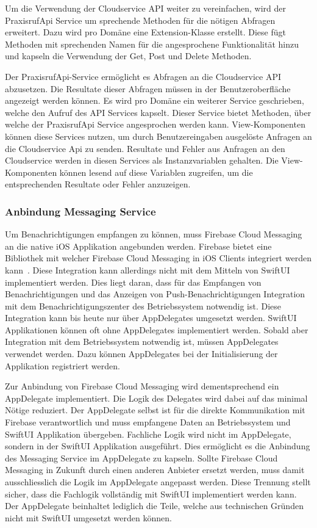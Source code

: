 Um die Verwendung der Cloudservice API weiter zu vereinfachen, wird der PraxisrufApi Service um sprechende Methoden für die nötigen Abfragen erweitert.
Dazu wird pro Domäne eine Extension-Klasse erstellt.
Diese fügt Methoden mit sprechenden Namen für die angesprochene Funktionalität hinzu und kapseln die Verwendung der Get, Post und Delete Methoden.

Der PraxisrufApi-Service ermöglicht es Abfragen an die Cloudservice API abzusetzen.
Die Resultate dieser Abfragen müssen in der Benutzeroberfläche angezeigt werden können.
Es wird pro Domäne ein weiterer Service geschrieben, welche den Aufruf des API Services kapselt.
Dieser Service bietet Methoden, über welche der PraxisrufApi Service angesprochen werden kann.
View-Komponenten können diese Services nutzen, um durch Benutzereingaben ausgelöste Anfragen an die Cloudservice Api zu senden.
Resultate und Fehler aus Anfragen an den Cloudservice werden in diesen Services als Instanzvariablen gehalten.
Die View-Komponenten können lesend auf diese Variablen zugreifen, um die entsprechenden Resultate oder Fehler anzuzeigen.

\subsubsection{Anbindung Messaging Service}

Um Benachrichtigungen empfangen zu können, muss Firebase Cloud Messaging an die native iOS Applikation angebunden werden.
Firebase bietet eine Bibliothek mit welcher Firebase Cloud Messaging in iOS Clients integriert werden kann~\cite{firebase_ios}.
Diese Integration kann allerdings nicht mit dem Mitteln von SwiftUI implementiert werden.
Dies liegt daran, dass für das Empfangen von Benachrichtigungen und das Anzeigen von Push-Benachrichtigungen Integration mit dem Benachrichtigungszenter des Betriebssystem notwendig ist.
Diese Integration kann bis heute nur über AppDelegates umgesetzt werden.
SwiftUI Applikationen können oft ohne AppDelegates implementiert werden.
Sobald aber Integration mit dem Betriebssystem notwendig ist, müssen AppDelegates verwendet werden.
Dazu können AppDelegates bei der Initialisierung der Applikation registriert werden.

Zur Anbindung von Firebase Cloud Messaging wird dementsprechend ein AppDelegate implementiert.
Die Logik des Delegates wird dabei auf das minimal Nötige reduziert.
Der AppDelegate selbst ist für die direkte Kommunikation mit Firebase verantwortlich und muss empfangene Daten an Betriebssystem und SwiftUI Applikation übergeben.
Fachliche Logik wird nicht im AppDelegate, sondern in der SwiftUI Applikation ausgeführt.
Dies ermöglicht es die Anbindung des Messaging Service im AppDelegate zu kapseln.
Sollte Firebase Cloud Messaging in Zukunft durch einen anderen Anbieter ersetzt werden, muss damit ausschliesslich die Logik im AppDelegate angepasst werden.
Diese Trennung stellt sicher, dass die Fachlogik vollständig mit SwiftUI implementiert werden kann.
Der AppDelegate beinhaltet lediglich die Teile, welche aus technischen Gründen nicht mit SwiftUI umgesetzt werden können.

